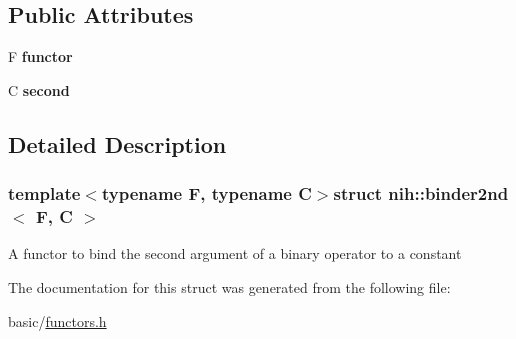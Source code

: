 \subsection*{\-Public \-Attributes}
\begin{DoxyCompactItemize}
\item 
\hypertarget{structnih_1_1binder2nd_a941c6409f76a9f54ae48279431062494}{
\-F {\bfseries functor}}
\label{structnih_1_1binder2nd_a941c6409f76a9f54ae48279431062494}

\item 
\hypertarget{structnih_1_1binder2nd_a3df9e60c01e37c9e8e3a7d6eb35395df}{
\-C {\bfseries second}}
\label{structnih_1_1binder2nd_a3df9e60c01e37c9e8e3a7d6eb35395df}

\end{DoxyCompactItemize}


\subsection{\-Detailed \-Description}
\subsubsection*{template$<$typename F, typename C$>$struct nih\-::binder2nd$<$ F, C $>$}

\-A functor to bind the second argument of a binary operator to a constant 

\-The documentation for this struct was generated from the following file\-:\begin{DoxyCompactItemize}
\item 
basic/\hyperlink{functors_8h}{functors.\-h}\end{DoxyCompactItemize}
